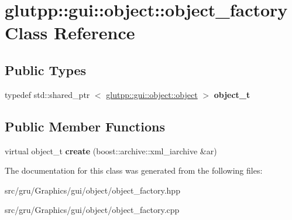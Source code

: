 \hypertarget{classglutpp_1_1gui_1_1object_1_1object__factory}{\section{glutpp\-:\-:gui\-:\-:object\-:\-:object\-\_\-factory \-Class \-Reference}
\label{classglutpp_1_1gui_1_1object_1_1object__factory}
}
\subsection*{\-Public \-Types}
\begin{DoxyCompactItemize}
\item 
\hypertarget{classglutpp_1_1gui_1_1object_1_1object__factory_a4a6e3b986deecc14be3b9f2f15dbd6f2}{typedef std\-::shared\-\_\-ptr\*
$<$ \hyperlink{classglutpp_1_1gui_1_1object_1_1object}{glutpp\-::gui\-::object\-::object} $>$ {\bfseries object\-\_\-t}}\label{classglutpp_1_1gui_1_1object_1_1object__factory_a4a6e3b986deecc14be3b9f2f15dbd6f2}

\end{DoxyCompactItemize}
\subsection*{\-Public \-Member \-Functions}
\begin{DoxyCompactItemize}
\item 
\hypertarget{classglutpp_1_1gui_1_1object_1_1object__factory_a68964b5574633f3dc6afd55e26e76958}{virtual object\-\_\-t {\bfseries create} (boost\-::archive\-::xml\-\_\-iarchive \&ar)}\label{classglutpp_1_1gui_1_1object_1_1object__factory_a68964b5574633f3dc6afd55e26e76958}

\end{DoxyCompactItemize}


\-The documentation for this class was generated from the following files\-:\begin{DoxyCompactItemize}
\item 
src/gru/\-Graphics/gui/object/object\-\_\-factory.\-hpp\item 
src/gru/\-Graphics/gui/object/object\-\_\-factory.\-cpp\end{DoxyCompactItemize}
